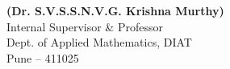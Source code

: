 \vspace{2cm} %

\noindent
\begin{minipage}[t]{0.50\textwidth}
    \centering
    \footnotesize
    \textbf{(Dr. S.V.S.S.N.V.G. Krishna Murthy)} \\
    Internal Supervisor \& Professor \\
    Dept. of Applied Mathematics, DIAT \\
    Pune -- 411025
\end{minipage}

\restoregeometry
